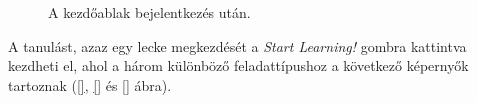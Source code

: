 \documentclass[11pt, a4paper]{article}
\begin{document}
     \begin{figure}[htbp]
     	\center
     	\caption{A kezdőablak bejelentkezés után.}
     	\label{fig:after-connect}
     \end{figure}
     A tanulást, azaz egy lecke megkezdését a \emph{Start Learning!} gombra kattintva kezdheti el, ahol a három különböző feladattípushoz a következő képernyők tartoznak (\ref{}, \ref{} és \ref{} ábra).
\end{document}
